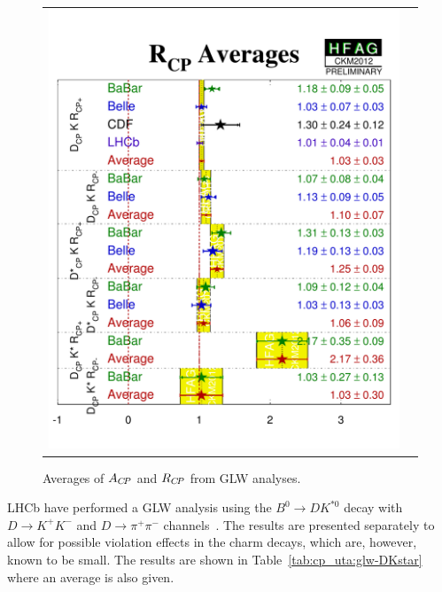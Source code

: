 \begin{figure}[htbp]
\begin{center}
\begin{tabular}{cc}
{        \includegraphics{figures/cp_uta/R_cp}
      }
    \end{tabular}
 \end{center}
  \vspace{-0.8cm}
  \caption{
    Averages of $A_{C\!P}$ and $R_{C\!P}$ from GLW analyses.
  }
  \label{fig:cp_uta:cus:glw}
\end{figure}

LHCb have performed a GLW analysis using the $B^0 \to DK^{*0}$ decay with $D \to K^+K^-$ and $D \to \pi^+\pi^-$ channels~\cite{Aaij:2014eha}.
The results are presented separately to allow for possible \CP violation effects in the charm decays, which are, however, known to be small.
The results are shown in Table~\ref{tab:cp_uta:glw-DKstar} where an average is also given.




\label{sec:cp_uta:cus:ads}


